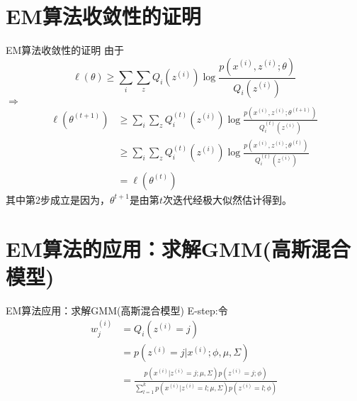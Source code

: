 \documentclass[noindent]{beamer}
\begin{document}
\section{EM算法收敛性的证明}
\begin{frame} {EM算法收敛性的证明}
由于
\begin{equation}
\ell(\theta) \geq  \sum_{i}  \sum_{z}Q_{i}(z^{(i)}) \log \frac{p(x^{(i)},z^{(i)};\theta)}{Q_{i}(z^{(i)})} 
\end{equation}
$\Rightarrow$
\begin{equation}
\begin{split}
\ell(\theta^{(t+1)}) &\geq  \sum_{i}  \sum_{z}Q_{i}^{(t)}(z^{(i)}) \log \frac{p(x^{(i)},z^{(i)};\theta^{(t+1)})}{Q_{i}^{(t)}(z^{(i)})} \\
                  &\geq \sum_{i}  \sum_{z}Q_{i}^{(t)}(z^{(i)}) \log \frac{p(x^{(i)},z^{(i)};\theta^{(t)})}{Q_{i}^{(t)}(z^{(i)})} \\
                  &= \ell(\theta^{(t)})
\end{split}
\end{equation}
其中第2步成立是因为，$\theta^{t+1}$是由第$t$次迭代经极大似然估计得到。
\end{frame}

\section{EM算法的应用：求解GMM(高斯混合模型)}
\begin{frame}{EM算法应用：求解GMM(高斯混合模型)}
\alert{E-step:}令
\begin{equation}
\begin{split}
    w_{j}^{(i)} &= Q_{i}(z^{(i)}=j) \\
                &= p(z^{(i)}=j|x^{(i)}; \phi , \mu , \Sigma )\\ 
                &= \frac{p(x^{(i)}|z^{(i)}=j; \mu , \Sigma ) p(z^{(i)}=j; \phi )}{ \sum _{l=1}^{k}p(x^{(i)}|z^{(i)}=l; \mu , \Sigma ) p(z^{(i)}=l; \phi )}
\end{split}
\end{equation}
\end{frame}
\end{document}
